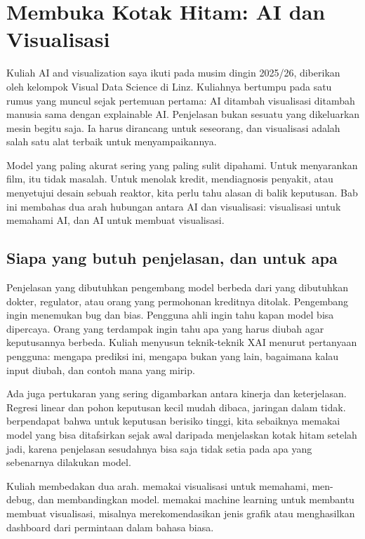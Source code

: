 \chapter{Membuka Kotak Hitam: AI dan Visualisasi}
\label{ch:xai}

Kuliah AI and visualization saya ikuti pada musim dingin 2025/26, diberikan oleh kelompok Visual
Data Science di Linz. Kuliahnya bertumpu pada satu rumus yang muncul sejak pertemuan pertama: AI ditambah
visualisasi ditambah manusia sama dengan explainable AI. Penjelasan bukan sesuatu yang dikeluarkan
mesin begitu saja. Ia harus dirancang untuk seseorang, dan visualisasi adalah salah satu alat
terbaik untuk menyampaikannya.

Model yang paling akurat sering yang paling sulit dipahami. Untuk menyarankan film, itu tidak
masalah. Untuk menolak kredit, mendiagnosis penyakit, atau menyetujui desain sebuah reaktor, kita
perlu tahu alasan di balik keputusan. Bab ini membahas dua arah hubungan antara AI dan
visualisasi: visualisasi untuk memahami AI, dan AI untuk membuat visualisasi.

\section{Siapa yang butuh penjelasan, dan untuk apa}

Penjelasan yang dibutuhkan pengembang model berbeda dari yang dibutuhkan dokter, regulator, atau
orang yang permohonan kreditnya ditolak. Pengembang ingin menemukan bug dan bias. Pengguna ahli
ingin tahu kapan model bisa dipercaya. Orang yang terdampak ingin tahu apa yang harus diubah agar
keputusannya berbeda. Kuliah menyusun teknik-teknik XAI menurut pertanyaan pengguna: mengapa
prediksi ini, mengapa bukan yang lain, bagaimana kalau input diubah, dan contoh mana yang mirip.

Ada juga pertukaran yang sering digambarkan antara kinerja dan keterjelasan. Regresi linear dan
pohon keputusan kecil mudah dibaca, jaringan dalam tidak. \citet{rudin2019} berpendapat bahwa untuk
keputusan berisiko tinggi, kita sebaiknya memakai model yang bisa ditafsirkan sejak awal daripada
menjelaskan kotak hitam setelah jadi, karena penjelasan sesudahnya bisa saja tidak setia pada apa
yang sebenarnya dilakukan model.

Kuliah membedakan dua arah.  memakai visualisasi untuk memahami, men-debug, dan
membandingkan model.  memakai machine learning untuk membantu membuat visualisasi,
misalnya merekomendasikan jenis grafik atau menghasilkan dashboard dari permintaan dalam bahasa
biasa.

